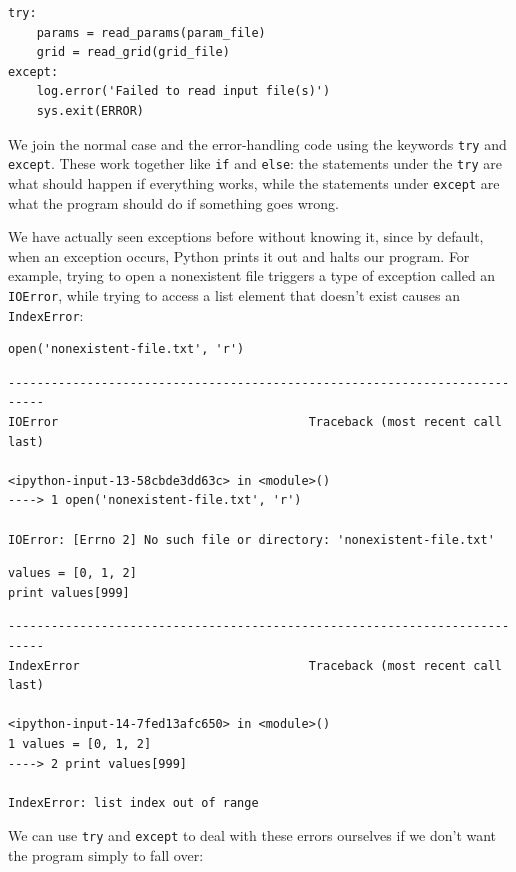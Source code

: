 \documentclass[]{book}
\begin{document}
\begin{verbatim}
try:
    params = read_params(param_file)
    grid = read_grid(grid_file)
except:
    log.error('Failed to read input file(s)')
    sys.exit(ERROR)
\end{verbatim}

We join the normal case and the error-handling code using the keywords
\texttt{try} and \texttt{except}. These work together like \texttt{if}
and \texttt{else}: the statements under the \texttt{try} are what should
happen if everything works, while the statements under \texttt{except}
are what the program should do if something goes wrong.

We have actually seen exceptions before without knowing it, since by
default, when an exception occurs, Python prints it out and halts our
program. For example, trying to open a nonexistent file triggers a type
of exception called an \texttt{IOError}, while trying to access a list
element that doesn't exist causes an \texttt{IndexError}:

\begin{verbatim}
open('nonexistent-file.txt', 'r')
\end{verbatim}

\begin{verbatim}
---------------------------------------------------------------------------
IOError                                   Traceback (most recent call last)

<ipython-input-13-58cbde3dd63c> in <module>()
----> 1 open('nonexistent-file.txt', 'r')

IOError: [Errno 2] No such file or directory: 'nonexistent-file.txt'
\end{verbatim}

\begin{verbatim}
values = [0, 1, 2]
print values[999]
\end{verbatim}

\begin{verbatim}
---------------------------------------------------------------------------
IndexError                                Traceback (most recent call last)

<ipython-input-14-7fed13afc650> in <module>()
1 values = [0, 1, 2]
----> 2 print values[999]

IndexError: list index out of range
\end{verbatim}

We can use \texttt{try} and \texttt{except} to deal with these errors
ourselves if we don't want the program simply to fall over:
\end{document}
